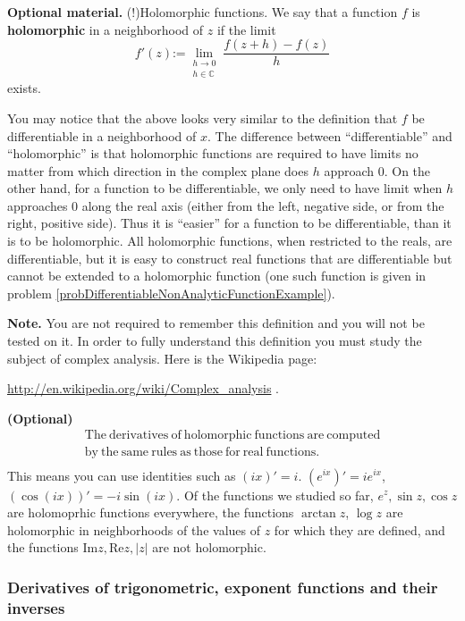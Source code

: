 \documentclass[12pt]{book}
\renewcommand{\Im}{\mathrm{Im}}
\renewcommand{\Re}{\mathrm{Re}}
\newcommand{\eqdef}{\textbf{:=}}
\newcommand{\optionalMaterial}{\textbf{(Optional)}}
\renewcommand{\emph}{\textbf}
\begin{document}
\textbf{Optional material.} (!)Holomorphic functions. We say that a function $f$ is \emph{holomorphic} in a neighborhood of  $z$ if the limit 
\[
f'(z)\eqdef \lim_{\substack{h\to 0\\ h\in \mathbb C}} \frac{ f(z+h)-f(z)}{h}
\]
exists.

You may notice that the above looks very similar to the definition that $f$ be differentiable in a neighborhood of $x$. The difference between ``differentiable'' and ``holomorphic'' is that holomorphic functions are required to have limits no matter from which direction in the complex plane does $h$ approach $0$. On the other hand, for a function to be differentiable, we only need to have limit when $h$ approaches $0$ along the real axis (either from the left, negative side, or from the right, positive side). Thus it is ``easier'' for a function to be differentiable, than it is to be holomorphic. All holomorphic functions, when restricted to the reals, are differentiable, but it is easy to construct real functions that are differentiable but cannot be extended to a holomorphic function (one such function is given in problem \ref{probDifferentiableNonAnalyticFunctionExample}).

\textbf{Note.} You are not required to remember this definition and you will not be tested on it. In order to fully understand this definition you must study the subject of complex analysis. Here is the Wikipedia page:

\url{http://en.wikipedia.org/wiki/Complex_analysis} \quad .

\optionalMaterial
\[\begin{array}{l}
\mathrm{The~derivatives~of~holomorphic~functions~are~computed} \\
\mathrm{by~the~same~rules~as~those~for~real~functions.} \\
\end{array}
\]
This means you can use identities such as $(ix)'=i$. $(e^{ix})'=ie^{ix}$, $(\cos (ix))'= -i\sin(ix)$. Of the functions we studied so far, $e^z, \sin z, \cos z$ are holomoprhic functions everywhere, the functions $\arctan z$, $\log z$ are holomorphic in neighborhoods of the values of $z$ for which they are defined, and the functions $\Im z, \Re z, |z|$ are not holomorphic.



\subsubsection{Derivatives of trigonometric, exponent functions and their inverses}
\end{document}
